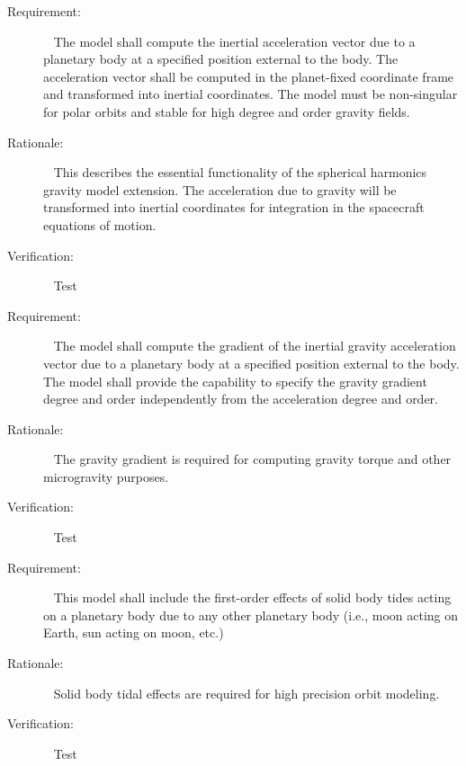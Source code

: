 \label{reqt:spherharm_grav_accel}
\begin{description}
\item[Requirement:]\ \newline
The model shall compute the inertial acceleration vector due to a planetary
body at a specified position external to the body. The acceleration vector
shall be computed in the planet-fixed coordinate frame and transformed into
inertial coordinates. The model must be non-singular for polar orbits and
stable for high degree and order gravity fields.
\item[Rationale:]\ \newline
This describes the essential functionality of the spherical harmonics gravity
model extension. The acceleration due to gravity will be transformed into 
inertial coordinates for integration in the spacecraft equations of motion.
\item[Verification:]\ \newline
Test
\end{description}

\label{reqt:spherharm_grav_grad}
\begin{description}
\item[Requirement:]\ \newline
The model shall compute the gradient of the inertial gravity acceleration vector
due to a planetary body at a specified position external to the body. The model
shall provide the capability to specify the gravity gradient degree and order
independently from the acceleration degree and order.
\item[Rationale:]\ \newline
The gravity gradient is required for computing gravity torque and other
microgravity purposes.
\item[Verification:]\ \newline
Test
\end{description}

\label{reqt:spherharm_solid_tides}
\begin{description}
  \item[Requirement:]\ \newline
This model shall include the first-order effects of solid body tides acting on 
a planetary body due to any other planetary body (i.e., moon acting on
Earth, sun acting on moon, etc.)
  \item[Rationale:]\ \newline
Solid body tidal effects are required for high precision orbit modeling.
  \item[Verification:]\ \newline
    Test
\end{description}

